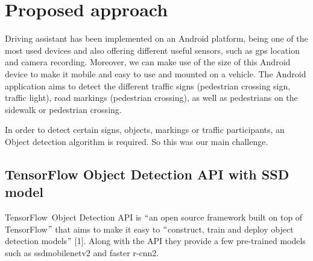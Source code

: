 \documentclass[12pt]{report}
\renewcommand{\_}{\kern-1.5pt\textunderscore\kern-1.5pt}
\begin{document}
\chapter{Proposed approach}
\begin{justify}
Driving assistant has been implemented on an Android platform, being one of the most used devices and also offering different useful sensors, such as gps location and camera recording. Moreover, we can make use of the size of this Android device to make it mobile and easy to use and mounted on a vehicle. The Android application aims to detect the different traffic signs (pedestrian crossing sign, traffic light), road markings (pedestrian crossing), as well as pedestrians on the sidewalk or pedestrian crossing.
\end{justify}\par

\begin{justify}
In order to detect certain signs, objects, markings or traffic participants, an Object detection algorithm is required. So this was our main challenge.
\end{justify}\par

\begin{adjustwidth}{0.5in}{0.0in}
\section{TensorFlow Object Detection API with SSD model}
\end{adjustwidth}

\begin{justify}
\tab TensorFlow\ Object Detection API is $``$an open source framework built on top of TensorFlow$"$  that aims to make it easy to $``$construct, train and deploy object detection models$"$  [1].  Along with the API they provide a few pre-trained models such as ssd\_mobilenetv2 and faster r-cnn2. 
\end{justify}\par
\end{document}
